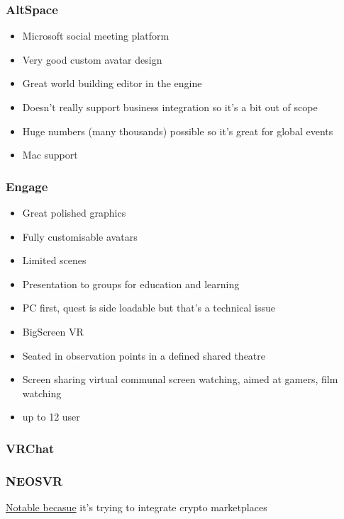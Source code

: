 \subsubsection{AltSpace}
\begin{itemize}
\item Microsoft social meeting platform
\item Very good custom avatar design
\item Great world building editor in the engine
\item Doesn't really support business integration so it's a bit out of scope
\item Huge numbers (many thousands) possible so it's great for global events
\item Mac support
\end{itemize}
\subsubsection{Engage}
\begin{itemize}
\item Great polished graphics
\item Fully customisable avatars
\item Limited scenes
\item Presentation to groups for education and learning
\item PC first, quest is side loadable but that's a technical issue
\item BigScreen VR
\item Seated in observation points in a defined shared theatre
\item Screen sharing virtual communal screen watching, aimed at gamers, film watching
\item up to 12 user
\end{itemize}
\subsubsection{VRChat}
\subsubsection{NEOSVR}
\href{https://neos.com/}{Notable becasue} it's trying to integrate crypto marketplaces
